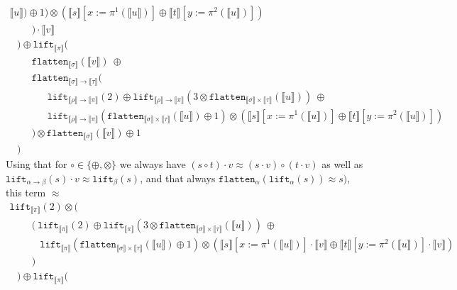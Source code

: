 \documentclass[a4paper,UKenglish,cleveref,autoref,numberwithinsect]{lipics-v2019}
\theoremstyle{definition}
\newcommand{\arrtype}{\rightarrow}
\newcommand{\flatten}{\mathtt{flatten}}
\newcommand{\lift}{\mathtt{lift}}
\newcommand{\typeinterpret}[1]{\llbracket #1 \rrbracket}
\newcommand{\interpret}[1]{\llbracket #1 \rrbracket}
\begin{document}
\begin{itemize}
\[\begin{array}{l}
      \interpret{u}) \oplus 1) \otimes
      (\interpret{s}[x:=\pi^1(\interpret{u})] \oplus
       \interpret{t}[y:=\pi^2(\interpret{u})]) \\
    \phantom{ABC}
    ) \cdot \interpret{v} \\
    \phantom{A} ) \oplus \lift_{\typeinterpret{\pi}}(\\
    \phantom{ABC}\flatten_{\typeinterpret{\sigma}}(\interpret{v})\ 
      \oplus \\
    \phantom{ABC}\flatten_{\typeinterpret{\sigma} \arrtype
      \typeinterpret{\tau}}( \\
      \phantom{ABCDE}
       \lift_{\typeinterpret{\rho} \arrtype \typeinterpret{\pi}}(2)
       \oplus \lift_{\typeinterpret{\rho} \arrtype
       \typeinterpret{\pi}}(3 \otimes \flatten_{\typeinterpret{\sigma}
       \times \typeinterpret{\tau}}(\interpret{u}))\ \oplus \\
    \phantom{ABCDE}
      \lift_{\typeinterpret{\rho} \arrtype \typeinterpret{\pi}}(
      \flatten_{\typeinterpret{\sigma} \times \typeinterpret{\tau}}(
      \interpret{u}) \oplus 1) \otimes
      (\interpret{s}[x:=\pi^1(\interpret{u})] \oplus
       \interpret{t}[y:=\pi^2(\interpret{u})]) \\
    \phantom{ABC} ) \otimes
    \flatten_{\typeinterpret{\sigma}}(\interpret{v}) \oplus 1 \\
    \phantom{A} )
  \end{array}
  \]
  Using that for $\circ \in \{\oplus,\otimes\}$ we always have
  $(s \circ t) \cdot v \approx (s \cdot v) \circ (t \cdot v)$ as well
  as $\lift_{\alpha\arrtype \beta}(s) \cdot v \approx \lift_\beta(s)$,
  and that always $\flatten_\alpha(\lift_\alpha(s)) \approx s)$, this
  term $\approx$
  \[
  \begin{array}{l}
  \lift_{\typeinterpret{\pi}}(2) \otimes (\\
    \phantom{ABC}
    (\ \lift_{\typeinterpret{\pi}}(2) \oplus
       \lift_{\typeinterpret{\pi}}(3 \otimes
          \flatten_{\typeinterpret{\sigma} \times
          \typeinterpret{\tau}}(\interpret{u}))\ \oplus \\
    \phantom{ABCD}
      \lift_{\typeinterpret{\pi}}(
      \flatten_{\typeinterpret{\sigma} \times \typeinterpret{\tau}}(
      \interpret{u}) \oplus 1) \otimes
      (\interpret{s}[x:=\pi^1(\interpret{u})] \cdot \interpret{v} \oplus
       \interpret{t}[y:=\pi^2(\interpret{u})] \cdot \interpret{v}) \\
    \phantom{ABC}
    )\\
    \phantom{A} ) \oplus \lift_{\typeinterpret{\pi}}(\\

\end{array}\]
\end{itemize}
\end{document}
